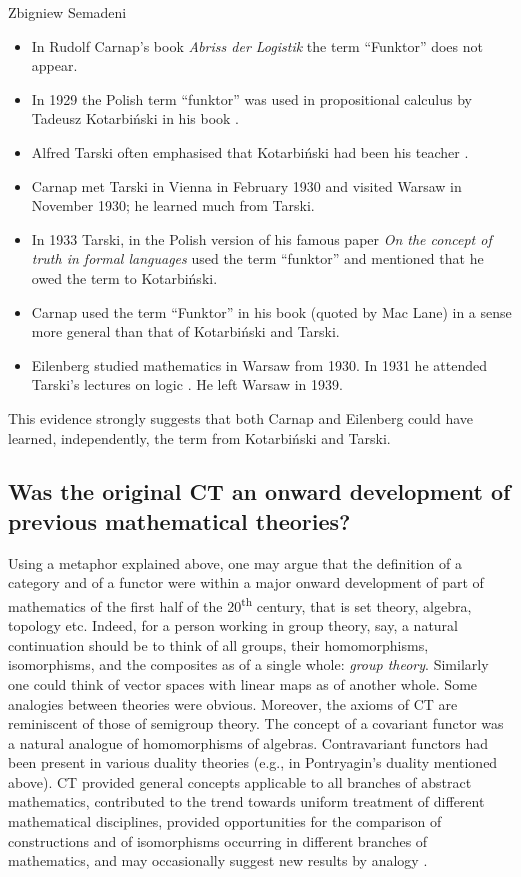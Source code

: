 \begin{artengenv}{Zbigniew Semadeni}
\begin{itemize}
\item In Rudolf Carnap's book \textit{Abriss der Logistik} \parencite{Abriss} the term ``Funktor'' does not appear. 
\item In 1929 the Polish term ``funktor'' was used in propositional calculus by 
Tadeusz Kotarbi\'nski in his book \parencite{Kotarbinski}.
\item Alfred Tarski often emphasised that Kotarbi\'nski had been his teacher 
\parencite[part~2]{Feferman}. 
\item Carnap met Tarski in Vienna in February 1930 and visited Warsaw in November 
1930; he learned much from Tarski. 
\item In 1933 Tarski, in the Polish version of his famous paper \textit{On the 
concept of truth in formal languages} \citeauthor{Tarski_sem} \parencite*{Tarski_sem} used the term ``funktor'' 
and mentioned that he owed the term to Kotarbiński.  
\item Carnap used the term ``Funktor''  in his book \parencite*{Logische} (quoted 
by Mac Lane) in a sense more general than that of Kotarbi\'nski and Tarski. 
\item Eilenberg studied mathematics in Warsaw from 1930. In 1931 he attended 
Tarski's lectures on logic \parencite[part~3 and~12]{Feferman}. He left Warsaw in 1939. 
\end{itemize}

This evidence strongly suggests that both Carnap and Eilenberg could have learned, 
independently, the term from Kotarbi{\'n}ski and Tarski.

\subsection{Was the original CT an onward development of previous mathematical theories?}
Using a metaphor explained above, one may argue that the definition of a 
category and of a functor were within a major onward development of part of 
mathematics of the first half of the 20\textsuperscript{th} century, that is set theory, 
algebra, topology etc. Indeed, for a person working in group theory, say, 
a natural continuation should be to think of all groups, their homomorphisms, 
isomorphisms, and the composites as of a single whole: \textit{group theory}. 
Similarly one could think of vector spaces with linear maps as of another whole. 
Some analogies between theories were obvious. Moreover, the axioms of CT are 
reminiscent of those of semigroup theory. The concept of a covariant functor 
was a natural analogue of homomorphisms of algebras. Contravariant functors 
had been present in various duality theories (e.g., in Pontryagin’s duality 
mentioned above). CT provided general concepts applicable to all branches of abstract 
mathematics, contributed to the trend towards uniform treatment of different 
mathematical disciplines, provided opportunities for the comparison of 
constructions and of isomorphisms occurring in different branches of mathematics, 
and may occasionally  suggest new results by analogy \parencite[p.236]{E-ML}. 


\end{artengenv}
